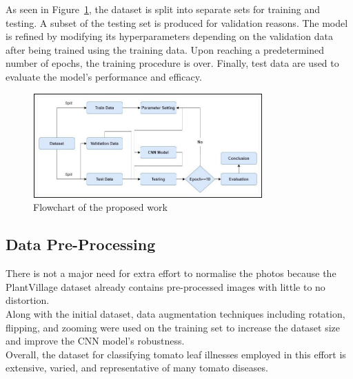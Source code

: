 \documentclass[conference]{IEEEtran}
\begin{document}
As seen in Figure~\ref{fig: Figure 1}, the dataset is split into separate sets for training and testing. A subset of the testing set is produced for validation reasons. The model is refined by modifying its hyperparameters depending on the validation data after being trained using the training data. Upon reaching a predetermined number of epochs, the training procedure is over. Finally, test data are used to evaluate the model's performance and efficacy.



\begin{figure}[H]
 \includegraphics[width=8.8cm, height=4cm]{Tomato Final Flowchart.jpg}
\caption{Flowchart of the proposed work}
\label{fig: Figure 1}
\end{figure}

\subsection{Data Pre-Processing}
There is not a major need for extra effort to normalise the photos because the PlantVillage dataset already contains pre-processed images with little to no distortion.\\
Along with the initial dataset, data augmentation techniques including rotation, flipping, and zooming were used on the training set to increase the dataset size and improve the CNN model's robustness.\\
Overall, the dataset for classifying tomato leaf illnesses employed in this effort is extensive, varied, and representative of many tomato diseases.



\end{document}
